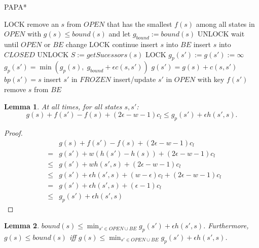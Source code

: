 \documentclass[letterpaper]{article}
\newtheorem{lemma}{Lemma}
\begin{document}
\begin{algorithm}
\caption{PAPA*}
\label{alg:PAPA*}
\begin{algorithmic}
\STATE LOCK
\STATE remove an $s$ from $OPEN$ that has the smallest $f(s)$ among all states in $OPEN$ with $g(s) \le bound(s)$ and let $g_{bound} := bound(s)$
\STATE UNLOCK
\STATE wait until $OPEN$ or $BE$ change
\STATE LOCK
\STATE continue
\ENDIF
\STATE insert $s$ into $BE$
\STATE insert $s$ into $CLOSED$
\STATE UNLOCK
\STATE $S := getSucessors(s)$
\STATE LOCK
\STATE $g_p(s') := g(s') := \infty$
\ENDIF
\STATE $g_p(s') = \min(g_p(s),\; g_{bound} + \epsilon c(s,s'))$
\STATE $g(s') = g(s) + c(s,s')$
\STATE $bp(s') = s$
\STATE insert $s'$ in $FROZEN$
\ELSE
\STATE insert/update $s'$ in $OPEN$ with key $f(s')$
\ENDIF
\ENDIF
\ENDFOR
\STATE remove $s$ from $BE$
\ENDWHILE
\end{algorithmic}
\end{algorithm}

\begin{lemma}
\label{lem:indep}
At all times, for all states $s,s'$:
\[g(s) + f(s') - f(s) + (2\epsilon-w-1) c_l \le g_p(s') + \epsilon h(s',s).\]
\end{lemma}

\begin{proof}
\begin{eqnarray*}
&&g(s) + f(s') - f(s) + (2\epsilon-w-1) c_l
\\&=& g(s') + w(h(s') - h(s)) + (2\epsilon-w-1) c_l
\\&\le& g(s') + wh(s',s) + (2\epsilon-w-1) c_l
\\&\le& g(s') + \epsilon h(s',s) + (w-\epsilon) c_l + (2\epsilon-w-1) c_l
\\&=& g(s') + \epsilon h(s',s) + (\epsilon-1) c_l
\\&\le& g_p(s') + \epsilon h(s',s)
\end{eqnarray*}
\end{proof}

\begin{lemma}
\label{lem:bound}
$bound(s) \le \min_{s'\in OPEN \cup BE} g_p(s') + \epsilon h(s',s)$. Furthermore, $g(s) \le bound(s)$ iff $g(s) \le \min_{s'\in OPEN \cup BE} g_p(s') + \epsilon h(s',s)$.
\end{lemma}
\end{document}
